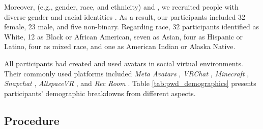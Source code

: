 Moreover,  (e.g., gender, race, and ethnicity) and  \cite{Crenshaw1990, kelly2023}, we recruited people with diverse gender and racial identities . As a result, our participants included 32 female, 23 male, and five non-binary. Regarding race, 32 participants identified as White, 12 as Black or African American, seven as Asian, four as Hispanic or Latino, four as mixed race, and one as American Indian or Alaska Native. %

All participants had created and used avatars in social virtual environments. Their commonly used platforms included \textit{Meta Avatars} \cite{metaavatars}, \textit{VRChat} \cite{vrchat}, \textit{Minecraft} \cite{minecraft}, \textit{Snapchat} \cite{snapchat}, \textit{AltspaceVR} \cite{altspacevr}, and \textit{Rec Room} \cite{recroom}.
Table \ref{tab:pwd_demographics} presents participants' demographic breakdowns from different aspects.

\subsection{Procedure}

